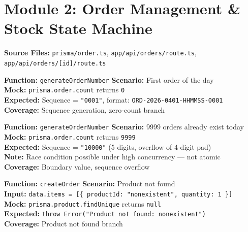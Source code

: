 ﻿\documentclass[12pt,a4paper]{report}
\newcommand{\ptwo}{\textbf{\color{p2orange}P2}}
\newcommand{\pthree}{\textbf{\color{p3blue}P3}}
\begin{document}
\section{Module 2: Order Management \& Stock State Machine}

\textbf{Source Files:} \texttt{prisma/order.ts}, \texttt{app/api/orders/route.ts}, \texttt{app/api/orders/[id]/route.ts}

\begin{tcolorbox}[testbox,title={ORD-001 \hfill \ptwo}]
\textbf{Function:} \texttt{generateOrderNumber} \quad \textbf{Scenario:} First order of the day \\
\textbf{Mock:} \texttt{prisma.order.count} returns \texttt{0} \\
\textbf{Expected:} Sequence = \texttt{"0001"}, format: \texttt{ORD-2026-0401-HHMMSS-0001} \\
\textbf{Coverage:} Sequence generation, zero-count branch
\end{tcolorbox}

\begin{tcolorbox}[testbox,title={ORD-002 \hfill \pthree\ --- Boundary}]
\textbf{Function:} \texttt{generateOrderNumber} \quad \textbf{Scenario:} 9999 orders already exist today \\
\textbf{Mock:} \texttt{prisma.order.count} returns \texttt{9999} \\
\textbf{Expected:} Sequence = \texttt{"10000"} (5 digits, overflow of 4-digit pad) \\
\textbf{Note:} Race condition possible under high concurrency --- not atomic \\
\textbf{Coverage:} Boundary value, sequence overflow
\end{tcolorbox}

\begin{tcolorbox}[testbox,title={ORD-003 \hfill \ptwo}]
\textbf{Function:} \texttt{createOrder} \quad \textbf{Scenario:} Product not found \\
\textbf{Input:} \texttt{data.items = [\{ productId: "nonexistent", quantity: 1 \}]} \\
\textbf{Mock:} \texttt{prisma.product.findUnique} returns \texttt{null} \\
\textbf{Expected:} \texttt{throw Error("Product not found: nonexistent")} \\
\textbf{Coverage:} Product not found branch
\end{tcolorbox}
\end{document}
